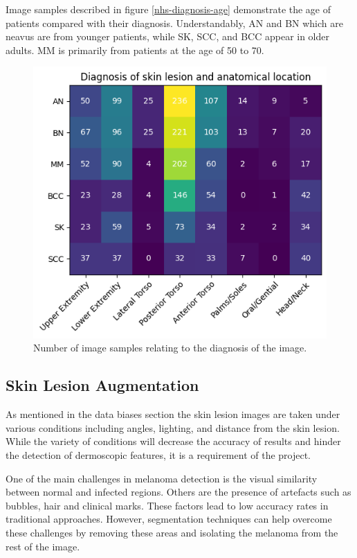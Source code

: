 Image samples described in figure \ref{nhs-diagnosis-age} demonstrate the age of patients compared with their diagnosis. Understandably, AN and BN which are neavus are from younger patients, while SK, SCC, and BCC appear in older adults. MM is primarily from patients at the age of 50 to 70.

\begin{figure}
	\centering
	\includegraphics[scale=0.8]{images/nhs/nhs-location-diagnosis.png}
	\caption{Number of image samples relating to the diagnosis of the image.} 
\end{figure}\label{nhs-location-diagnosis}


\subsection{Skin Lesion Augmentation}
As mentioned in the data biases section the skin lesion images are taken under various conditions including angles, lighting, and distance from the skin lesion. While the variety of conditions will decrease the accuracy of results and hinder the detection of dermoscopic features, it is a requirement of the project.

One of the main challenges in melanoma detection is the visual similarity between normal and infected regions. Others are the presence of artefacts such as bubbles, hair and clinical marks\cite{Albahli2020}. These factors lead to low accuracy rates in traditional approaches. However, segmentation techniques can help overcome these challenges by removing these areas and isolating the melanoma from the rest of the image.

